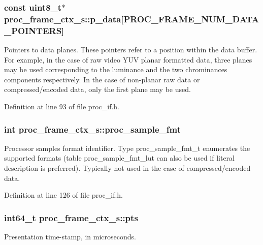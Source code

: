 \subsubsection[{\texorpdfstring{p\+\_\+data}{p_data}}]{\setlength{\rightskip}{0pt plus 5cm}const uint8\+\_\+t$\ast$ proc\+\_\+frame\+\_\+ctx\+\_\+s\+::p\+\_\+data\mbox{[}P\+R\+O\+C\+\_\+\+F\+R\+A\+M\+E\+\_\+\+N\+U\+M\+\_\+\+D\+A\+T\+A\+\_\+\+P\+O\+I\+N\+T\+E\+RS\mbox{]}}\hypertarget{structproc__frame__ctx__s_ac6381b5fe9fa44fc575ab35a12e19a50}{}\label{structproc__frame__ctx__s_ac6381b5fe9fa44fc575ab35a12e19a50}
Pointers to data planes. These pointers refer to a position within the data buffer. For example, in the case of raw video Y\+UV planar formatted data, three planes may be used corresponding to the luminance and the two chrominances components respectively. In the case of non-\/planar raw data or compressed/encoded data, only the first plane may be used. 

Definition at line 93 of file proc\+\_\+if.\+h.

\subsubsection[{\texorpdfstring{proc\+\_\+sample\+\_\+fmt}{proc_sample_fmt}}]{\setlength{\rightskip}{0pt plus 5cm}int proc\+\_\+frame\+\_\+ctx\+\_\+s\+::proc\+\_\+sample\+\_\+fmt}\hypertarget{structproc__frame__ctx__s_aa68098f554e8a167b34d8454af44afda}{}\label{structproc__frame__ctx__s_aa68098f554e8a167b34d8454af44afda}
Processor samples format identifier. Type proc\+\_\+sample\+\_\+fmt\+\_\+t enumerates the supported formats (table proc\+\_\+sample\+\_\+fmt\+\_\+lut can also be used if literal description is preferred). Typically not used in the case of compressed/encoded data. 

Definition at line 126 of file proc\+\_\+if.\+h.

\subsubsection[{\texorpdfstring{pts}{pts}}]{\setlength{\rightskip}{0pt plus 5cm}int64\+\_\+t proc\+\_\+frame\+\_\+ctx\+\_\+s\+::pts}\hypertarget{structproc__frame__ctx__s_ab08e6752be55e23d4a37ec37931a30b9}{}\label{structproc__frame__ctx__s_ab08e6752be55e23d4a37ec37931a30b9}
Presentation time-\/stamp, in microseconds. 

